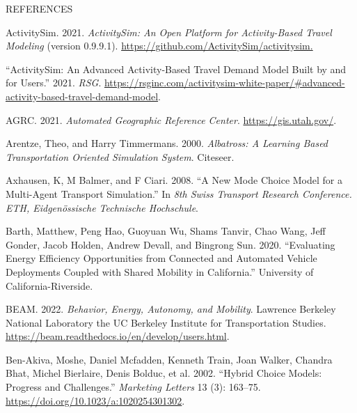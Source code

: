 \documentclass[12pt, oneside, openright]{byuthesis}
\newlength{\cslhangindent}
\newlength{\cslentryspacingunit} %
\newenvironment{CSLReferences}[2] %
 {%
  \setlength{\parindent}{0pt}
  \ifodd #1
  \let\oldpar\par
  \def\par{\hangindent=\cslhangindent\oldpar}
  \fi
  \setlength{\parskip}{#2\cslentryspacingunit}
 }%
 {}
\begin{document}
\cleardoublepage
    \begin{centering}
    REFERENCES\\
     \baselineskip
    \end{centering}

\hypertarget{refs}{}
\begin{CSLReferences}{1}{0}
\leavevmode{}%
ActivitySim. 2021. \emph{ActivitySim: An Open Platform for Activity-Based Travel Modeling} (version 0.9.9.1). \url{https://github.com/ActivitySim/activitysim.}

\leavevmode{}%
{``ActivitySim: An Advanced Activity-Based Travel Demand Model Built by and for Users.''} 2021. \emph{RSG}. \url{https://rsginc.com/activitysim-white-paper/\#advanced-activity-based-travel-demand-model}.

\leavevmode{}%
AGRC. 2021. \emph{Automated Geographic Reference Center}. \url{https://gis.utah.gov/}.

\leavevmode{}%
Arentze, Theo, and Harry Timmermans. 2000. \emph{Albatross: A Learning Based Transportation Oriented Simulation System}. Citeseer.

\leavevmode{}%
Axhausen, K, M Balmer, and F Ciari. 2008. {``A New Mode Choice Model for a Multi-Agent Transport Simulation.''} In \emph{8th Swiss Transport Research Conference. ETH, Eidgen{ö}ssische Technische Hochschule}.

\leavevmode{}%
Barth, Matthew, Peng Hao, Guoyuan Wu, Shams Tanvir, Chao Wang, Jeff Gonder, Jacob Holden, Andrew Devall, and Bingrong Sun. 2020. {``Evaluating Energy Efficiency Opportunities from Connected and Automated Vehicle Deployments Coupled with Shared Mobility in California.''} University of California-Riverside.

\leavevmode{}%
BEAM. 2022. \emph{Behavior, Energy, Autonomy, and Mobility}. Lawrence Berkeley National Laboratory the UC Berkeley Institute for Transportation Studies. \url{https://beam.readthedocs.io/en/develop/users.html}.

\leavevmode{}%
Ben-Akiva, Moshe, Daniel Mcfadden, Kenneth Train, Joan Walker, Chandra Bhat, Michel Bierlaire, Denis Bolduc, et al. 2002. {``Hybrid Choice Models: Progress and Challenges.''} \emph{Marketing Letters} 13 (3): 163--75. \url{https://doi.org/10.1023/a:1020254301302}.


\end{CSLReferences}
\end{document}
